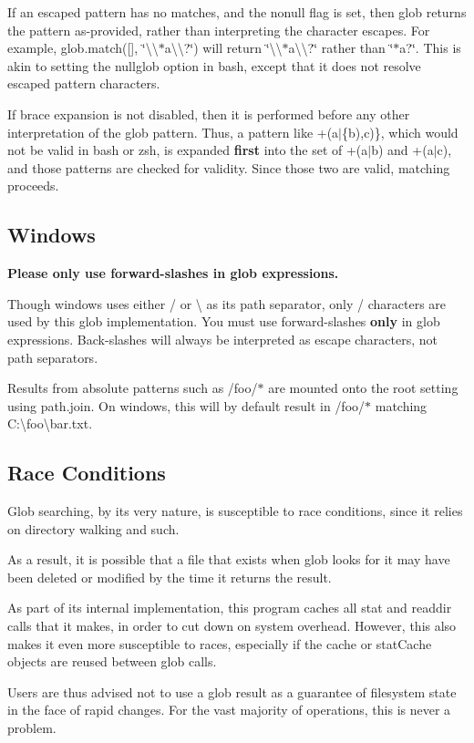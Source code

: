 If an escaped pattern has no matches, and the {\ttfamily nonull} flag is set, then glob returns the pattern as-\/provided, rather than interpreting the character escapes. For example, {\ttfamily glob.\+match(\mbox{[}\mbox{]}, \char`\"{}\textbackslash{}\textbackslash{}$\ast$a\textbackslash{}\textbackslash{}?\char`\"{})} will return {\ttfamily \char`\"{}\textbackslash{}\textbackslash{}$\ast$a\textbackslash{}\textbackslash{}?\char`\"{}} rather than {\ttfamily \char`\"{}$\ast$a?\char`\"{}}. This is akin to setting the {\ttfamily nullglob} option in bash, except that it does not resolve escaped pattern characters.

If brace expansion is not disabled, then it is performed before any other interpretation of the glob pattern. Thus, a pattern like {\ttfamily +(a$\vert$\{b),c)\}}, which would not be valid in bash or zsh, is expanded {\bfseries first} into the set of {\ttfamily +(a$\vert$b)} and {\ttfamily +(a$\vert$c)}, and those patterns are checked for validity. Since those two are valid, matching proceeds.

\subsection*{Windows}

{\bfseries Please only use forward-\/slashes in glob expressions.}

Though windows uses either {\ttfamily /} or {\ttfamily \textbackslash{}} as its path separator, only {\ttfamily /} characters are used by this glob implementation. You must use forward-\/slashes {\bfseries only} in glob expressions. Back-\/slashes will always be interpreted as escape characters, not path separators.

Results from absolute patterns such as {\ttfamily /foo/$\ast$} are mounted onto the root setting using {\ttfamily path.\+join}. On windows, this will by default result in {\ttfamily /foo/$\ast$} matching {\ttfamily C\+:\textbackslash{}foo\textbackslash{}bar.\+txt}.

\subsection*{Race Conditions}

Glob searching, by its very nature, is susceptible to race conditions, since it relies on directory walking and such.

As a result, it is possible that a file that exists when glob looks for it may have been deleted or modified by the time it returns the result.

As part of its internal implementation, this program caches all stat and readdir calls that it makes, in order to cut down on system overhead. However, this also makes it even more susceptible to races, especially if the cache or stat\+Cache objects are reused between glob calls.

Users are thus advised not to use a glob result as a guarantee of filesystem state in the face of rapid changes. For the vast majority of operations, this is never a problem. 
